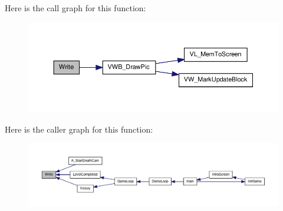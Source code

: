 Here is the call graph for this function:
\nopagebreak
\begin{figure}[H]
\begin{center}
\leavevmode
\includegraphics[width=392pt]{WL__MENU_8H_a2a840b71aa584f6332da78f4eeec8767_cgraph}
\end{center}
\end{figure}




Here is the caller graph for this function:
\nopagebreak
\begin{figure}[H]
\begin{center}
\leavevmode
\includegraphics[width=400pt]{WL__MENU_8H_a2a840b71aa584f6332da78f4eeec8767_icgraph}
\end{center}
\end{figure}





